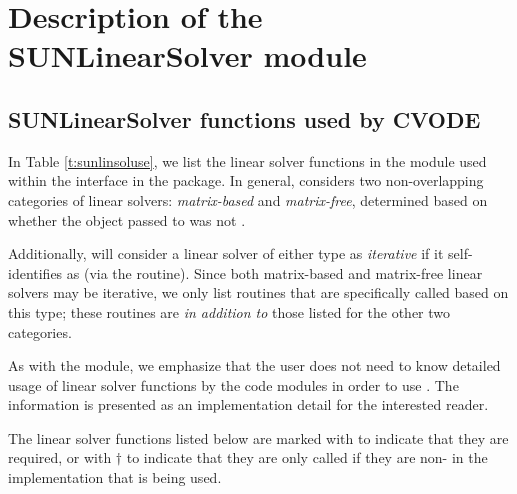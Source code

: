 \chapter{Description of the SUNLinearSolver module}\label{s:sunlinsol}



\section{SUNLinearSolver functions used by CVODE}

In Table \ref{t:sunlinsoluse}, we list the linear solver
functions in the {\sunlinsol} module used within the {\cvls} interface
in the {\cvode} package.  In general, {\cvls} considers two
non-overlapping categories of linear solvers: \emph{matrix-based} and
\emph{matrix-free}, determined based on whether the {\sunmatrix}
object  passed to  was not .

Additionally, {\cvls} will consider a linear solver of either type as
\emph{iterative} if it self-identifies as
 (via the 
routine).  Since both matrix-based and matrix-free linear solvers may
be iterative, we only list {\sunlinsol} routines that are specifically
called based on this type; these routines are \emph{in addition to} those
listed for the other two categories.

As with the {\sunmatrix} module, we emphasize that the {\cvode} user
does not need to know detailed usage of linear solver functions by the
{\cvode} code modules in order to use {\cvode}. The information is
presented as an implementation detail for the interested reader.

The linear solver functions listed below are marked with \cm to
indicate that they are required, or with $\dagger$ to indicate that
they are only called if they are non- in the {\sunlinsol}
implementation that is being used.  

